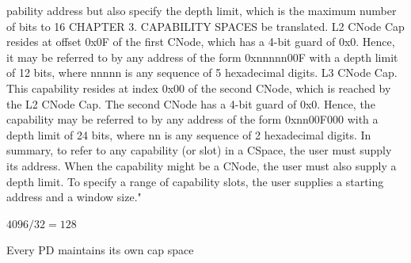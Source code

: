 pability address but also specify the depth limit, which is the maximum number of bits to
16 CHAPTER 3. CAPABILITY SPACES
be translated. L2 CNode Cap resides at offset 0x0F of the first CNode, which has a 4-bit
guard of 0x0. Hence, it may be referred to by any address of the form 0xnnnnn00F with a
depth limit of 12 bits, where nnnnn is any sequence of 5 hexadecimal digits.
L3 CNode Cap. This capability resides at index 0x00 of the second CNode, which is reached by
the L2 CNode Cap. The second CNode has a 4-bit guard of 0x0. Hence, the capability may
be referred to by any address of the form 0xnn00F000 with a depth limit of 24 bits, where
nn is any sequence of 2 hexadecimal digits.
In summary, to refer to any capability (or slot) in a CSpace, the user must supply its address.
When the capability might be a CNode, the user must also supply a depth limit. To specify a
range of capability slots, the user supplies a starting address and a window size.\cite{seL4:2024}" 


$4096 / 32 = 128$



Every PD maintains its own cap space